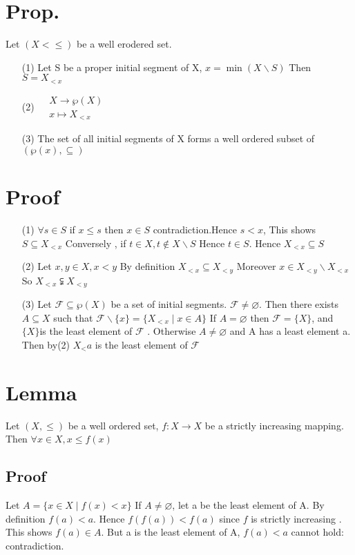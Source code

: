 \documentclass{book}
\begin{document}
\section{Prop.}
Let $(X<\leq)$ be a well erodered set.
\begin{itemize}
    \item[(1)] Let S be a proper initial segment of X, $x= \min(X\backslash S)$ Then $S=X_{<x}$
    \item[(2)] $\begin{aligned}
        &X\rightarrow\wp(X)\\ &x\mapsto X_{<x}
    \end{aligned}$
    \item[(3)] The set of all initial segments of X forms a well ordered subset of $(\wp(x),\subseteq)$
\end{itemize}
\section{Proof}
\begin{itemize}
    \item [(1)] $\forall s\in S$ if $x\leq s$ then $x\in S$ contradiction.Hence $s<x$, This shows $S\subseteq X_{<x}$ Conversely , if $t\in X, t\not\in X\backslash S$ Hence $t\in S.$ Hence $X_{<x}\subseteq S$
    \item [(2)]Let $x,y\in X,x<y$ By definition $X_{<x}\subseteq X_{<y}$ Moreover $x\in X_{<y}\backslash X_{<x}$ So $X_{<x}\subsetneqq X_{<y}$
    \item [(3)]Let $\mathcal{F}\subseteq\wp(X)$ be a set of initial segments. $\mathcal{F}\not=\varnothing$. Then there exists $A\subseteq X$ such that $\mathcal{F}\backslash \{x\}=\{X_{<x}\mid x\in A\}$ If $A=\varnothing$ then $\mathcal{F}=\{X\}$, and $\{X\}$is the least element of $\mathcal{F}$ . Otherwise $A\not=\varnothing$ and A has a least element a. Then by(2) $X_<a$ is the least element of $\mathcal{F}$
\end{itemize} 
\section{Lemma}
Let $(X,\leq)$ be a well ordered set, $f:X\rightarrow X$ be a strictly increasing mapping. Then $\forall x\in X, x\leq f(x)$
\subsection{Proof}
Let $A=\{x\in X\mid f(x)<x\}$ If $A\not=\varnothing$, let a be the least element of A. By definition $f(a)<a$. Hence $f(f(a))<f(a)$ since $f$ is strictly increasing . This shows $f(a)\in A$. But a is the least element of A, $f(a)<a$ cannot hold: contradiction.
\end{document}

